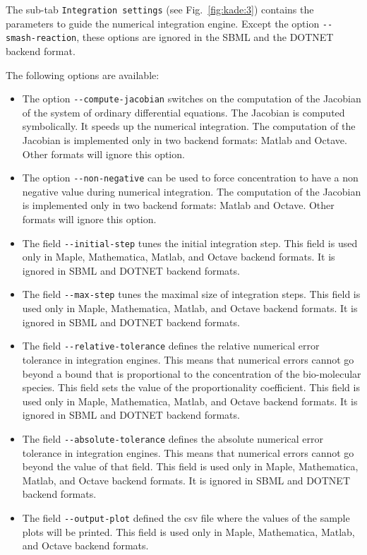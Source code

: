 \documentclass[11pt]{book}
\begin{document}
The sub-tab \texttt{Integration settings} (see Fig.~\ref{fig:kade:3}) contains the parameters to guide the numerical integration engine. Except the option \texttt{-{}-smash-reaction}, these options are ignored in the SBML and the
DOTNET backend format.

The following options are available:
\begin{itemize}
  \item The option \texttt{-{}-compute-jacobian} switches on the computation of the Jacobian of the system of ordinary differential equations.
  The Jacobian is computed symbolically. It speeds up the numerical integration. The computation of the Jacobian is implemented only in two backend formats:  Matlab and Octave. Other formats will ignore this option.
  \item The option \texttt{-{}-non-negative} can be used to force concentration to have a non negative value during numerical integration.
  The computation of the Jacobian is implemented only in two backend formats:  Matlab and Octave. Other formats will ignore this option.
  \item The field \texttt{-{}-initial-step} tunes the initial integration step.
  This field is used only in Maple, Mathematica, Matlab, and Octave backend formats.
  It is ignored in SBML and DOTNET backend formats.
  \item The field \texttt{-{}-max-step} tunes the maximal size of integration steps. This field is used only in Maple, Mathematica, Matlab, and Octave backend formats.
  It is ignored in SBML and DOTNET backend formats.
  \item The field \texttt{-{}-relative-tolerance} defines the relative numerical error tolerance in integration engines. This means that numerical errors cannot go beyond a bound that is proportional to the concentration of the bio-molecular species. This field sets the value of the proportionality coefficient.   This field is used only in Maple, Mathematica, Matlab, and Octave backend formats.
  It is ignored in SBML and DOTNET backend formats.
  \item The field \texttt{-{}-absolute-tolerance} defines the absolute numerical error tolerance in integration engines. This means that numerical errors cannot go beyond the value of that field.  This field is used only in Maple, Mathematica, Matlab, and Octave backend formats. It is ignored in SBML and DOTNET backend formats.
  \item The field \texttt{-{}-output-plot} defined the csv file where the values of the sample plots will be printed. This field is used only in Maple, Mathematica, Matlab, and Octave backend formats.

\end{itemize}
\end{document}
